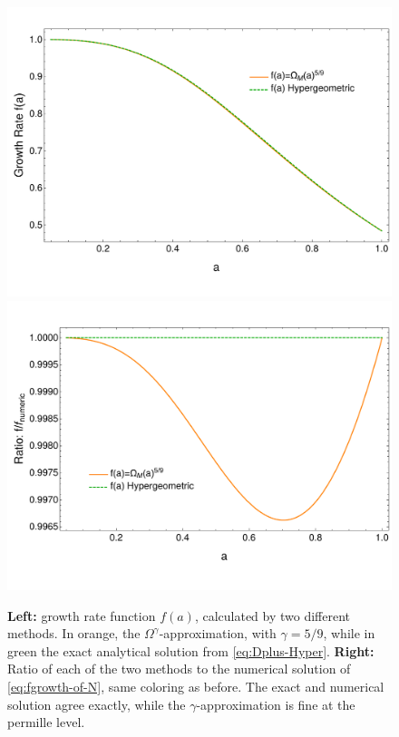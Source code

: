 \begin{figure}[tbph]
	\includegraphics[width=0.47\linewidth]{Figures/fGrowthRate-ofa-Approx-vs-ExactHyper}
	\includegraphics[width=0.47\linewidth]{Figures/fGrowthRate-Ratio-ofa-Approx-vs-ExactHyper-RatioToNumeric}
	\caption[Growth rate comparison for CDM]{
	\textbf{Left:} growth rate function $f(a)$, calculated by two different methods. In orange, the $\Omega^\gamma$-approximation, with $\gamma=5/9$, while
	in green the exact analytical solution from \cref{eq:Dplus-Hyper}.
    \textbf{Right:} Ratio of each of the two methods to the numerical solution of \cref{eq:fgrowth-of-N}, same coloring as before. The exact and numerical solution
agree exactly, while the $\gamma$-approximation is fine at the permille level.}
	\label{fig:fgrowthrate-ofa-approx-vs-exacthyper}
\end{figure}



